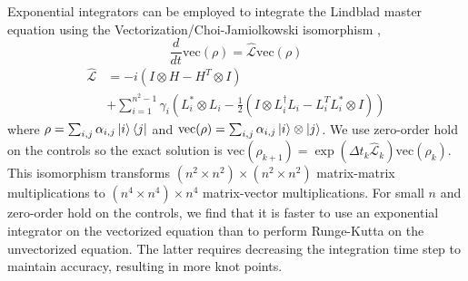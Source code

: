 Exponential integrators can be employed to integrate the Lindblad master equation
using the Vectorization/Choi-Jamiolkowski isomorphism \cite{Landi2018},
\begin{equation}
  \frac{d}{dt} \textrm{vec}({\rho}) = \hat{\mathcal{L}} \textrm{vec}({\rho})
\end{equation}
\begin{equation}
  \begin{aligned}
    \hat{\mathcal{L}} &= -i(I \otimes H - H^{T} \otimes I)\\
    &+ \sum_{i = 1}^{n^{2} - 1} \gamma_{i}
    (L_{i}^{*} \otimes L_{i} - \frac{1}{2} (I \otimes L_{i}^{\dagger}L_{i}
    - L_{i}^{T}L_{i}^{*} \otimes I))
  \end{aligned}
\end{equation}
where $\rho = \sum_{i, j} \alpha_{i, j} \ket{i}\bra{j}$
and $\textrm{vec}(\rho) = \sum_{i, j} \alpha_{i, j} \ket{i} \otimes \ket{j}$.
We use zero-order hold on the controls so the exact solution is
$\textrm{vec}(\rho_{k + 1}) = \exp(\Delta t_{k} \hat{\mathcal{L}}_{k}) \textrm{vec}(\rho_{k})$.
This isomorphism transforms $(n^{2} \times n^{2}) \times (n^{2} \times n^{2})$
matrix-matrix multiplications to $(n^{4} \times n^{4}) \times n^{4}$ matrix-vector
multiplications. For small $n$ and zero-order hold on the controls, we find that it is
faster to use an exponential integrator on the vectorized equation than to perform
Runge-Kutta on the unvectorized equation. The latter requires decreasing the integration
time step to maintain accuracy, resulting in more knot points.

